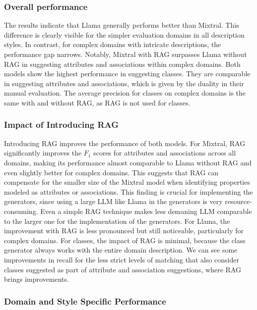 \subsubsection{Overall performance}

The results indicate that Llama generally performs better than Mixtral.
This difference is clearly visible for the simpler evaluation domains in all description styles.
In contrast, for complex domains with intricate descriptions, the performance gap narrows.
Notably, Mixtral with RAG surpasses Llama without RAG in suggesting attributes and associations within complex domains.
Both models show the highest performance in suggesting classes.
They are comparable in suggesting attributes and associations, which is given by the duality in their manual evaluation.
The average precision for classes on complex domains is the same with and without RAG, as RAG is not used for classes.


\subsubsection{Impact of Introducing RAG}

Introducing RAG improves the performance of both models.
For Mixtral, RAG significantly improves the $F_1$ scores for attributes and associations across all domains, making its performance almost comparable to Llama without RAG and even slightly better for complex domains.
This suggests that RAG can compensate for the smaller size of the Mixtral model when identifying properties modeled as attributes or associations.
This finding is crucial for implementing the generators, since using a large LLM like Llama in the generators is very resource-consuming.
Even a simple RAG technique makes less demaning LLM comparable to the larger one for the implementation of the generators.
For Llama, the improvement with RAG is less pronounced but still noticeable, particularly for complex domains.
For classes, the impact of RAG is minimal, because the class generator always works with the entire domain description.
We can see some improvements in recall for the less strict levels of matching that also consider classes suggested as part of attribute and association suggestions, where RAG brings improvements.


\subsubsection{Domain and Style Specific Performance}

